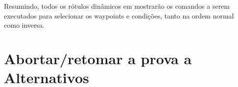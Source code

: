 Resumindo, todos os rótulos dinâmicos em  mostrarão os comandos a serem executados para selecionar os waypoints e condições, tanto na ordem normal como inversa.

  








\section{Abortar/retomar a prova a Alternativos}

